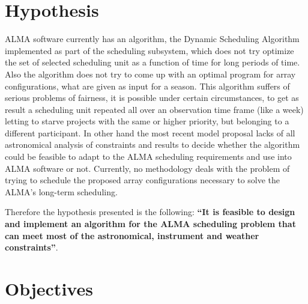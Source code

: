 \section{Hypothesis}

ALMA software currently has an algorithm, the Dynamic Scheduling Algorithm implemented as
part of the scheduling subsystem, which does not try optimize the set of selected scheduling unit
as a function of time for long periods of time. Also the algorithm does not try to come up with an
optimal program for array configurations, what are given as input for a season. This algorithm suffers of
serious problems of fairness, it is possible under certain circumstances, to get as result a
scheduling unit repeated all over an observation time frame (like a week) letting to starve
projects with the same or higher priority, but belonging to a different participant.
In other hand the most recent model proposal lacks of all astronomical analysis of constraints and
results to decide whether the algorithm could be feasible to adapt to the ALMA scheduling requirements
and use into ALMA software or not.
Currently, no methodology deals with the problem of trying to schedule the proposed
array configurations necessary to solve the ALMA’s long-term scheduling.

Therefore the hypothesis presented is the following: \textbf{``It is feasible to design and implement an algorithm for the ALMA scheduling problem that can meet most of the astronomical, instrument and weather constraints''}.

\section{Objectives}

